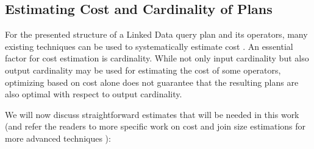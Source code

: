 \subsection{Estimating Cost and Cardinality of Plans}
\label{sec:estimation}
For the presented structure of a Linked Data query plan and its operators, many existing techniques can be used to systematically estimate cost \cite{stocker_sparql_2008,neumann_scalable_2009,huang_selectivity_2010}. An essential factor for cost estimation is cardinality. While not only input cardinality but also output cardinality may be used for estimating the cost of some operators, optimizing based on cost alone does not guarantee that the resulting plans are also optimal with respect to output cardinality. 

We will now discuss straightforward estimates that will be needed in this work (and refer the readers to more specific work on cost and join size estimations for more advanced techniques \cite{stocker_sparql_2008,neumann_scalable_2009,huang_selectivity_2010}):

